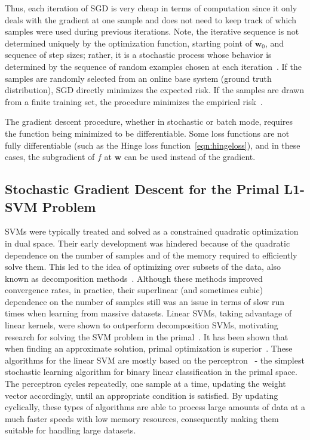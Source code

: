 \documentclass[reqno]{vcuthesis}
\numberwithin{equation}{chapter}
\begin{document}
Thus, each iteration of SGD is very cheap in terms of computation since it only deals with the gradient at one sample and does not need to keep track of which samples were used during previous iterations. Note, the iterative sequence is not determined uniquely by the optimization function, starting point of $\bm w_0$, and sequence of step sizes; rather, it is a stochastic process whose behavior is determined by the sequence of random examples chosen at each iteration~\cite{bottou2010large,bottou2018optimization}. If the samples are randomly selected from an online base system (ground truth distribution), SGD directly minimizes the expected risk. If the samples are drawn from a finite training set, the procedure minimizes the empirical risk~\cite{bottou2002stochastic}.

The gradient descent procedure, whether in stochastic or batch mode, requires the function being minimized to be differentiable. Some loss functions are not fully differentiable (such as the Hinge loss function~\ref{eqn:hingeloss}), and in these cases, the subgradient of $f$ at $\bm{w}$ can be used instead of the gradient. 

\subsection{Stochastic Gradient Descent for the Primal L1-SVM Problem}
SVMs were typically treated and solved as a constrained quadratic optimization in dual space. Their early development was hindered because of the quadratic dependence on the number of samples and of the memory required to efficiently solve them. This led to the idea of optimizing over subsets of the data, also known as decomposition methods~\cite{boser1992training,Joachims1999,keerthi2001improvements,Platt1998}. Although these methods improved convergence rates, in practice, their superlinear (and sometimes cubic) dependence on the number of samples still was an issue in terms of slow run times when learning from massive datasets. Linear SVMs, taking advantage of linear kernels, were shown to outperform decomposition SVMs, motivating research for solving the SVM problem in the primal~\cite{Chapelle2007,panagiotakopoulos2013stochastic}. It has been shown that when finding an approximate solution, primal optimization is superior~\cite{Chapelle2007}. These algorithms for the linear SVM are mostly based on the perceptron~\cite{freund1999large,rosenblatt1958perceptron} - the simplest stochastic learning algorithm for binary linear classification in the primal space. The perceptron cycles repeatedly, one sample at a time, updating the weight vector accordingly, until an appropriate condition is satisfied. By updating cyclically, these types of algorithms are able to process large amounts of data at a much faster speeds with low memory resources, consequently making them suitable for handling large datasets. 
\end{document}
